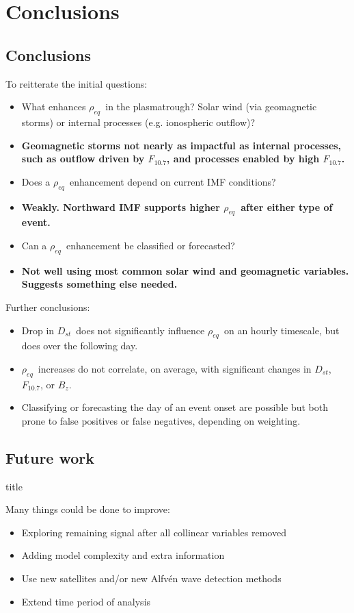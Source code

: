 \documentclass[xcolor={dvipsnames,table}]{beamer}
\newcommand{\subheader}{    		\begin{center}
  	\begin{beamercolorbox}[sep=4pt,center,shadow=true,rounded=true]{title}
  		\usebeamerfont{title}\subsecname\par%
  	\end{beamercolorbox}
  	\vfill
  	\end{center}}
\newcommand{\req}{\ensuremath{\rho_{eq}}} %
\newcommand{\dst}{\ensuremath{D_{st}}} %
\newcommand{\f}{\ensuremath{F_{10.7}}} %
\begin{document}
\section{Conclusions}
\subsection{Conclusions}
\begin{frame}
	To reitterate the initial questions:	
	\begin{itemize}
		\item What enhances \req\ in the plasmatrough? Solar wind (via geomagnetic storms) or internal processes (e.g. ionospheric outflow)?
		\item[] \textbf{Geomagnetic storms not nearly as impactful as internal processes, such as outflow driven by \f, and processes enabled by high \f.}
		\item Does a \req\ enhancement depend on current IMF conditions?
		\item[] \textbf{Weakly. Northward IMF supports higher \req\ after either type of event.}
		\item Can a \req\ enhancement be classified or forecasted?
		\item[] \textbf{Not well using most common solar wind and geomagnetic variables. Suggests something else needed.}
	\end{itemize}
\end{frame}

\begin{frame}
	Further conclusions:
	\begin{itemize}
		\item Drop in \dst\ does not significantly influence \req\ on an hourly timescale, but does over the following day.
		\item \req\ increases do not correlate, on average, with significant changes in \dst, \f, or $B_z$.
		\item Classifying or forecasting the day of an event onset are possible but both prone to false positives or false negatives, depending on weighting.
	\end{itemize}
\end{frame}


\subsection{Future work}
\begin{frame}
	\subheader
	Many things could be done to improve:
	\begin{itemize}
		\item Exploring remaining signal after all collinear variables removed
		\item Adding model complexity and extra information
		\item Use new satellites and/or new Alfvén wave detection methods
		\item Extend time period of analysis
	\end{itemize}
\end{frame}
\end{document}
